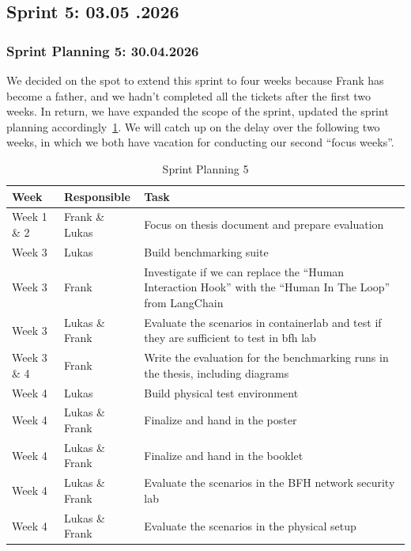 \subsection{Sprint 5: 03.05 .2026}\label{subsec:sprint-5}

\subsubsection{Sprint Planning 5: 30.04.2026}\label{subsubsec:sprint-planning-5}

We decided on the spot to extend this sprint to four weeks because Frank has become a father, and we hadn't completed all the tickets after the first two weeks.
In return, we have expanded the scope of the sprint, updated the sprint planning accordingly~\ref{tab:sprint-planning-5}.
We will catch up on the delay over the following two weeks, in which we both have vacation for conducting our second \enquote{focus weeks}.

\begin{table}[H]
    \centering
    \begin{tabularx}{\textwidth}{l l X}
		\toprule
        \textbf{Week} & \textbf{Responsible} & \textbf{Task} \\
        \midrule
        Week 1 \& 2 & Frank \& Lukas & Focus on thesis document and prepare evaluation \\
        Week 3 & Lukas & Build benchmarking suite  \\
        Week 3 & Frank & Investigate if we can replace the \enquote{Human Interaction Hook} with the \enquote{Human In The Loop} from LangChain \\
        Week 3 & Lukas \& Frank & Evaluate the scenarios in containerlab and test if they are sufficient to test in bfh lab \\
        Week 3 \& 4 & Frank & Write the evaluation for the benchmarking runs in the thesis, including diagrams \\
        Week 4 & Lukas & Build physical test environment  \\
        Week 4 & Lukas \& Frank  & Finalize and hand in the poster \\
        Week 4 & Lukas \& Frank  & Finalize and hand in the booklet \\
        Week 4 & Lukas \& Frank  & Evaluate the scenarios in the BFH network security lab \\
        Week 4 & Lukas \& Frank  & Evaluate the scenarios in the physical setup \\
        \bottomrule
    \end{tabularx}
    \caption{Sprint Planning 5}
    \label{tab:sprint-planning-5}
\end{table}

